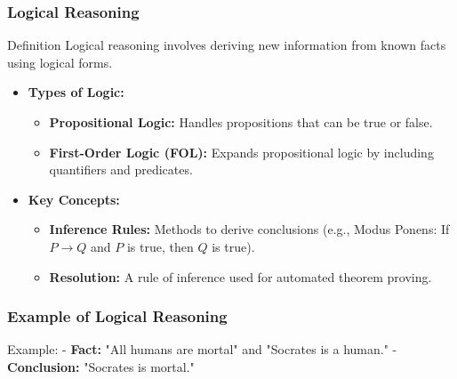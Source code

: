 \documentclass[aspectratio=169]{beamer}
\begin{document}
\begin{frame}[fragile]
    \frametitle{Logical Reasoning}
    \begin{block}{Definition}
        Logical reasoning involves deriving new information from known facts using logical forms.
    \end{block}
    
    \begin{itemize}
        \item \textbf{Types of Logic:}
            \begin{itemize}
                \item \textbf{Propositional Logic:} Handles propositions that can be true or false.
                \item \textbf{First-Order Logic (FOL):} Expands propositional logic by including quantifiers and predicates.
            \end{itemize}

        \item \textbf{Key Concepts:}
            \begin{itemize}
                \item \textbf{Inference Rules:} Methods to derive conclusions (e.g., Modus Ponens: If $P \rightarrow Q$ and $P$ is true, then $Q$ is true).
                \item \textbf{Resolution:} A rule of inference used for automated theorem proving.
            \end{itemize}
    \end{itemize}
\end{frame}

\begin{frame}[fragile]
    \frametitle{Example of Logical Reasoning}
    \begin{exampleblock}{Example:}
        - \textbf{Fact:} "All humans are mortal" and "Socrates is a human." 
        - \textbf{Conclusion:} "Socrates is mortal."
    \end{exampleblock}
\end{frame}
\end{document}
